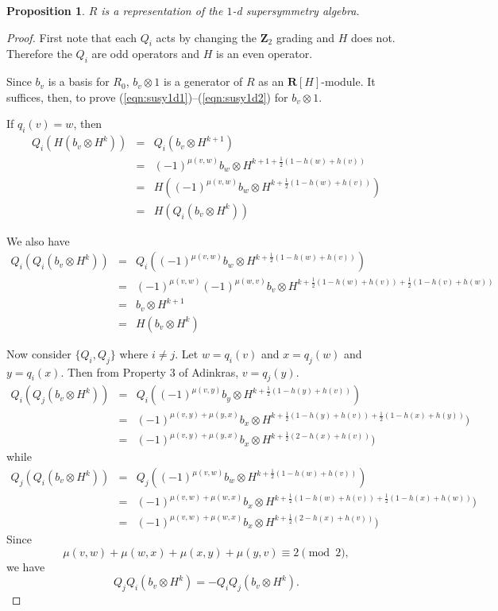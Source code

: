 \documentclass[12pt,twoside,singlespace]{article}
\numberwithin{equation}{section}
\newtheorem{prop}[equation]{Proposition}
\theoremstyle{definition}
\newcommand{\ZZ}{\mathbf{Z}}
\newcommand{\RR}{\mathbf{R}}
\begin{document}
\begin{prop}
\label{prop:rep1}
$R$ is a representation of the $1$-d supersymmetry algebra.
\end{prop}
\begin{proof}
First note that each $Q_i$ acts by changing the $\ZZ_2$ grading and $H$ does not.  Therefore the $Q_i$ are odd operators and $H$ is an even operator.

Since $b_v$ is a basis for $R_0$, $b_v\otimes 1$ is a generator of $R$ as an $\RR[H]$-module.  It suffices, then, to prove (\ref{eqn:susy1d1})--(\ref{eqn:susy1d2}) for $b_v\otimes 1$.

If $q_i(v)=w$, then
\begin{eqnarray*}
Q_i(H(b_v\otimes H^k))&=&Q_i(b_v\otimes H^{k+1})\\
&=&(-1)^{\mu(v,w)}b_w\otimes H^{k+1+\frac12(1-h(w)+h(v))}\\
&=&H((-1)^{\mu(v,w)}b_w\otimes H^{k+\frac12(1-h(w)+h(v))})\\
&=&H(Q_i(b_v\otimes H^k))
\end{eqnarray*}

We also have
\begin{eqnarray*}
Q_i(Q_i(b_v\otimes H^k))
&=&Q_i((-1)^{\mu(v,w)} b_w\otimes H^{k+\frac12(1-h(w)+h(v))})\\
&=&(-1)^{\mu(v,w)} (-1)^{\mu(w,v)} b_v\otimes H^{k+\frac12(1-h(w)+h(v))+\frac12(1-h(v)+h(w))}\\
&=&b_v\otimes H^{k+1}\\
&=&H(b_v\otimes H^{k})
\end{eqnarray*}

Now consider $\{Q_i,Q_j\}$ where $i\not=j$.  Let $w=q_i(v)$ and $x=q_j(w)$ and $y=q_i(x)$.  Then from Property 3 of Adinkras, $v=q_j(y)$.
\begin{eqnarray*}
Q_i(Q_j(b_v\otimes H^k))
&=&Q_i((-1)^{\mu(v,y)}b_y\otimes H^{k+\frac12(1-h(y)+h(v))})\\
&=&(-1)^{\mu(v,y)+\mu(y,x)}b_x\otimes H^{k+\frac12(1-h(y)+h(v))+\frac12(1-h(x)+h(y))})\\
&=&(-1)^{\mu(v,y)+\mu(y,x)}b_x\otimes H^{k+\frac12(2-h(x)+h(v))})
\end{eqnarray*}
while
\begin{eqnarray*}
Q_j(Q_i(b_v\otimes H^k))
&=&Q_j((-1)^{\mu(v,w)}b_w\otimes H^{k+\frac12(1-h(w)+h(v))})\\
&=&(-1)^{\mu(v,w)+\mu(w,x)}b_x\otimes H^{k+\frac12(1-h(w)+h(v))+\frac12(1-h(x)+h(w))})\\
&=&(-1)^{\mu(v,w)+\mu(w,x)}b_x\otimes H^{k+\frac12(2-h(x)+h(v))})
\end{eqnarray*}
Since
\[\mu(v,w)+\mu(w,x)+\mu(x,y)+\mu(y,v)\equiv 2\pmod{2},\]
we have
\[Q_jQ_i(b_v\otimes H^k)=-Q_iQ_j(b_v\otimes H^k).\]
\end{proof}
\end{document}
